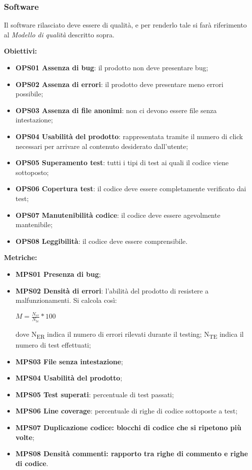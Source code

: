 \documentclass[../piano_di_qualifica.tex]{subfiles}
\begin{document}
\subsubsection{Software}
Il software rilasciato deve essere di qualità, e per renderlo tale si farà riferimento al \emph{Modello di qualità} descritto sopra.

\textbf{Obiettivi:}
\smallbreak
\begin{itemize}
	\item \textbf{OPS01 Assenza di bug}: il prodotto non deve presentare bug;
	\item \textbf{OPS02 Assenza di errori}: il prodotto deve presentare meno errori possibile;
	\item \textbf{OPS03 Assenza di file anonimi}: non ci devono essere file senza intestazione;
	\item \textbf{OPS04 Usabilità del prodotto}: rappresentata tramite il numero di click necessari per arrivare al contenuto desiderato dall'utente;
	\item \textbf{OPS05 Superamento test}: tutti i tipi di test ai quali il codice viene sottoposto;
	\item \textbf{OPS06 Copertura test}: il codice deve essere completamente verificato dai test;
	\item \textbf{OPS07 Manutenibilità codice}: il codice deve essere agevolmente mantenibile;
	\item \textbf{OPS08 Leggibilità}: il codice deve essere comprensibile.
\end{itemize}

\textbf{Metriche:}
\smallbreak
\begin{itemize}
	\item \textbf{MPS01 Presenza di bug};
	\item \textbf{MPS02 Densità di errori}: l'abilità del prodotto di resistere a malfunzionamenti. Si calcola così:
	      \begin{center} $M = \frac{N_{er}}{N_{te}} * 100$ \end{center}
	      dove
	      \subitem N\textsubscript{ER} indica il numero di errori rilevati durante il testing;
	      \subitem N\textsubscript{TE} indica il numero di test effettuati;
	\item \textbf{MPS03 File senza intestazione};
	\item \textbf{MPS04 Usabilità del prodotto};
	\item \textbf{MPS05 Test superati}: percentuale di test passati;
	\item \textbf{MPS06 Line coverage}: percentuale di righe di codice sottoposte a test;
	\item \textbf{MPS07 Duplicazione codice: blocchi di codice che si ripetono più volte};
	\item \textbf{MPS08 Densità commenti: rapporto tra righe di commento e righe di codice}.
\end{itemize}
\end{document}
